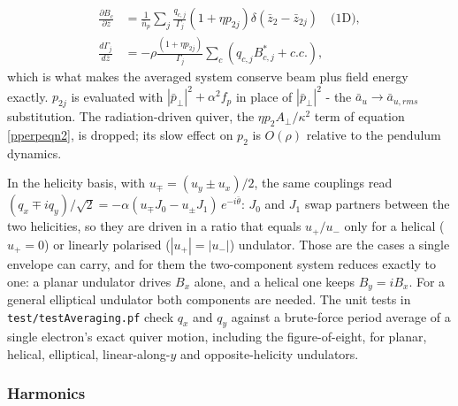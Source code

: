 \documentclass[12pt]{article}%
\begin{document}
\begin{align}
\frac{\partial B_c}{\partial \bar{z}} &= \frac{1}{\bar{n}_p}\sum_{j} \frac{q_{c,j}}{\Gamma_j} (1+\eta p_{2j}) \delta(\bar{z}_2 - \bar{z}_{2j}) \quad \text{(1D)}, \\
\frac{d \Gamma_{j}}{d \bar{z}} &= - \rho \frac{(1 + \eta p_{2j})}{\Gamma_j} \sum_c (q_{c,j} B^*_{c,j} + c.c.),
\end{align}
which is what makes the averaged system conserve beam plus field energy exactly. $p_{2j}$ is evaluated with $|\bar{p}_\bot|^2 + \alpha^2 f_p$ in place of $|\bar{p}_\bot|^2$ - the $\bar{a}_u \rightarrow \bar{a}_{u,rms}$ substitution. The radiation-driven quiver, the $\eta p_2 A_\bot / \kappa^2$ term of equation \eqref{pperpeqn2}, is dropped; its slow effect on $p_2$ is $O(\rho)$ relative to the pendulum dynamics.

In the helicity basis, with $u_\mp = (u_y \pm u_x)/2$, the same couplings read $(q_x \mp i q_y)/\sqrt{2} = -\alpha (u_\mp J_0 - u_\pm J_1)\, e^{-i\bar{\theta}}$: $J_0$ and $J_1$ swap partners between the two helicities, so they are driven in a ratio that equals $u_+/u_-$ only for a helical ($u_+ = 0$) or linearly polarised ($|u_+| = |u_-|$) undulator. Those are the cases a single envelope can carry, and for them the two-component system reduces exactly to one: a planar undulator drives $B_x$ alone, and a helical one keeps $B_y = i B_x$. For a general elliptical undulator both components are needed. The unit tests in {\tt test/testAveraging.pf} check $q_x$ and $q_y$ against a brute-force period average of a single electron's exact quiver motion, including the figure-of-eight, for planar, helical, elliptical, linear-along-$y$ and opposite-helicity undulators.

\subsubsection{Harmonics}

\label{puff-avg-harm}
\end{document}
